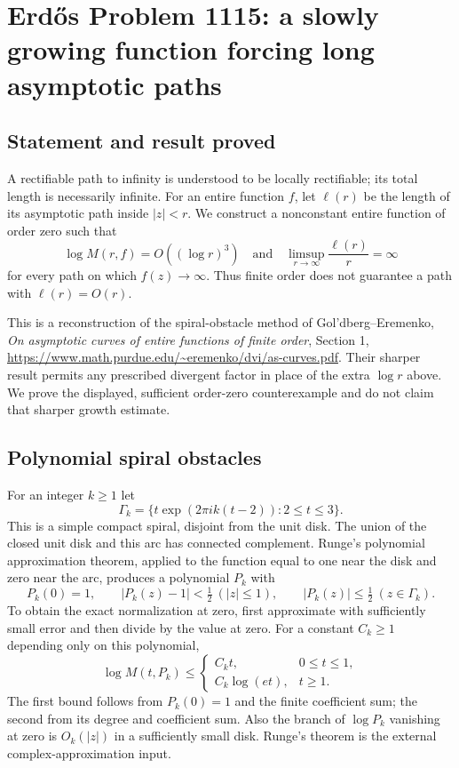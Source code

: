 \section*{Erd\H{o}s Problem 1115: a slowly growing function forcing long asymptotic paths}
\subsection*{Statement and result proved}
A rectifiable path to infinity is understood to be locally rectifiable; its total length is necessarily infinite. For an entire function $f$, let $\ell(r)$ be the length of its asymptotic path inside $|z|<r$. We construct a nonconstant entire function of order zero such that
\[
 \log M(r,f)=O((\log r)^3)
 \quad\text{and}\quad
 \limsup_{r\to\infty}\frac{\ell(r)}r=\infty
\]
for every path on which $f(z)\to\infty$. Thus finite order does not guarantee a path with $\ell(r)=O(r)$.

This is a reconstruction of the spiral-obstacle method of Gol'dberg--Eremenko, \emph{On asymptotic curves of entire functions of finite order}, Section 1, \url{https://www.math.purdue.edu/~eremenko/dvi/as-curves.pdf}. Their sharper result permits any prescribed divergent factor in place of the extra $\log r$ above. We prove the displayed, sufficient order-zero counterexample and do not claim that sharper growth estimate.

\subsection*{Polynomial spiral obstacles}
For an integer $k\ge1$ let
\[
 \Gamma_k=\{t\exp(2\pi i k(t-2)):2\le t\le3\}.
\]
This is a simple compact spiral, disjoint from the unit disk. The union of the closed unit disk and this arc has connected complement. Runge's polynomial approximation theorem, applied to the function equal to one near the disk and zero near the arc, produces a polynomial $P_k$ with
\[
 P_k(0)=1,\qquad |P_k(z)-1|<\tfrac12\ (|z|\le1),\qquad
 |P_k(z)|\le\tfrac12\ (z\in\Gamma_k).
 \tag{1}
\]
To obtain the exact normalization at zero, first approximate with sufficiently small error and then divide by the value at zero.
For a constant $C_k\ge1$ depending only on this polynomial,
\[
 \log M(t,P_k)\le
 \begin{cases}C_kt,&0\le t\le1,\\
 C_k\log(et),&t\ge1.
 \end{cases}
 \tag{2}
\]
The first bound follows from $P_k(0)=1$ and the finite coefficient sum; the second from its degree and coefficient sum. Also the branch of $\log P_k$ vanishing at zero is $O_k(|z|)$ in a sufficiently small disk. Runge's theorem is the external complex-approximation input.

